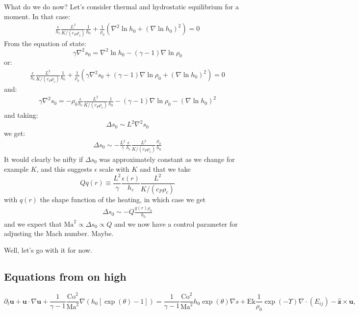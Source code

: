 \documentclass{aastex631}
\newcommand{\del}{\nabla}
\renewcommand{\vec}{\boldsymbol}
\begin{document}
What do we do now?  Let's consider thermal and hydrostatic equilibrium for a moment.  In that case:
\begin{align}
\frac{\epsilon}{h_c} \frac{L^2}{K/(c_P \rho_c)}\frac{1}{h_0} +  \frac{1}{\rho_0} \left(\nabla^2 \ln h_0 + (\nabla \ln h_0)^2 \right) = 0
\end{align}
From the equation of state:
\begin{equation}
  \gamma \nabla^2 s_0 = \nabla^2 \ln h_0 - (\gamma-1)\nabla \ln \rho_0
\end{equation}
or:
\begin{align}
\frac{\epsilon}{h_c} \frac{L^2}{K/(c_P \rho_c)}\frac{1}{h_0} +  \frac{1}{\rho_0} \left(\gamma \nabla^2 s_0 + (\gamma-1)\nabla \ln \rho_0 + (\nabla \ln h_0)^2 \right) = 0
\end{align}
and:
\begin{align}
 \gamma \nabla^2 s_0 = - \rho_0 \frac{\epsilon}{h_c} \frac{L^2}{K/(c_P \rho_c)}\frac{1}{h_0} - (\gamma-1)\nabla \ln \rho_0 - (\nabla \ln h_0)^2
\end{align}
and taking:
\begin{equation}
  \Delta s_0 \sim L^2 \nabla^2 s_0
\end{equation}
we get:
\begin{align}
 \Delta s_0 \sim - \frac{L^2}{\gamma} \frac{\epsilon}{h_c} \frac{L^2}{K/(c_P \rho_c)}\frac{\rho_0}{h_0}
\end{align}
It would clearly be nifty if $\Delta s_0$ was approximately constant as we change for example $K$, and this suggests $\epsilon$ scale with $K$ and that we take
\begin{equation}
Q q(r)\equiv \frac{L^2}{\gamma} \frac{\epsilon(r)}{h_c} \frac{L^2}{K/(c_P \rho_c)}
\end{equation}
with $q(r)$ the shape function of the heating,
in which case we get
\begin{align}
 \Delta s_0 \sim - Q\frac{q(r) \rho_0}{h_0}
\end{align}
and we expect that $\mathrm{Ma}^2 \propto \Delta s_0 \propto Q$ and we now have a control parameter for adjusting the Mach number.  Maybe.

Well, let's go with it for now.

\subsection{Equations from on high}

\begin{equation}
  \partial_t \vec{u} + \vec{u}\cdot \del \vec{u} + \frac{1}{\gamma-1}\frac{\mathrm{Co}^2}{\mathrm{Ma}^{2}}\del (h_0[\exp(\theta)-1]) =
  \frac{1}{\gamma-1}\frac{\mathrm{Co}^2}{\mathrm{Ma}^{2}} h_0\exp(\theta)\del s
  + \mathrm{Ek}\frac{1}{\rho_0}\exp(-\Upsilon)\del\cdot (E_{ij}) - \vec{\hat{z}} \times \vec{u},
\end{equation}
\end{document}
